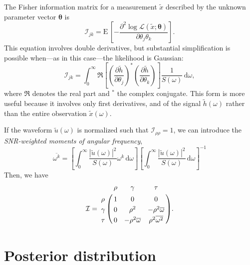 \documentclass{iopart}
\begin{document}
The Fisher information matrix for a measurement $\tilde x$ described by the unknown parameter vector $\boldsymbol{\theta}$ is
%
\begin{equation}\label{eq:general-fisher-matrix}
	\mathcal{I}_{jk} = \mathrm{E} \, \left[
		-\frac{\partial^2 \log
			\mathcal{L}(\tilde x ; \boldsymbol\theta)}
			{\partial \theta_j \theta_k}
	\right].
\end{equation}
%
This equation involves double derivatives, but substantial simplification is possible when---as in this case---the likelihood is Gaussian:
%
\begin{equation}\label{eq:gaussian-fisher-matrix}
	\mathcal{I}_{jk} = \int_0^\infty \Re \left[
        \left(\frac{\partial \tilde h}{\partial \theta_j}\right)^*
        \left(\frac{\partial \tilde h}{\partial \theta_k}\right)
	\right] \frac{1}{S(\omega)} \, \mathrm{d}\omega,
\end{equation}
%
where $\Re$ denotes the real part and $^*$ the complex conjugate. This form is more useful because it involves only first derivatives, and of the signal $\tilde h (\omega)$ rather than the entire observation $\tilde x (\omega)$.

If the waveform $\tilde u (\omega)$ is normalized such that $\mathcal{I}_{\rho\rho} = 1$, we can introduce the \textit{\ac{SNR}-weighted moments of angular frequency},
%
\begin{equation}\label{eq:angular-frequency-moments}
    \overline{\omega^k} =
        \left[ \int_0^\infty \frac{|\tilde u (\omega)|^2}{S(\omega)} \omega^k \, \mathrm{d}\omega \right]
        \left[ \int_0^\infty \frac{|\tilde u (\omega)|^2}{S(\omega)} \, \mathrm{d}\omega \right]^{-1}
\end{equation}
%
Then, we have
%
\begin{eqnarray*}
	\mathcal{I} = \bordermatrix{
        ~ & \rho & \gamma & \tau \cr
        \rho & 1 & 0 & 0 \cr
        \gamma & 0 & \rho^2 & -\rho^2 \overline{\omega} \cr
        \tau & 0 & -\rho^2 \overline{\omega} & \rho^2 \overline{\omega^2}
    }.
\end{eqnarray*}

\section{Posterior distribution}
\end{document}
